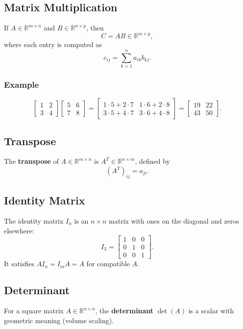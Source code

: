 \documentclass[a4paper,12pt]{article}
\begin{document}
\subsection{Matrix Multiplication}
If $A \in \mathbb{R}^{m \times n}$ and $B \in \mathbb{R}^{n \times p}$, then
\[
C = AB \in \mathbb{R}^{m \times p},
\]
where each entry is computed as
\[
c_{ij} = \sum_{k=1}^n a_{ik} b_{kj}.
\]

\subsubsection{Example}
\[
\begin{bmatrix}
1 & 2 \\
3 & 4
\end{bmatrix}
\begin{bmatrix}
5 & 6 \\
7 & 8
\end{bmatrix}
=
\begin{bmatrix}
1\cdot 5 + 2\cdot 7 & 1\cdot 6 + 2\cdot 8 \\
3\cdot 5 + 4\cdot 7 & 3\cdot 6 + 4\cdot 8
\end{bmatrix}
=
\begin{bmatrix}
19 & 22 \\
43 & 50
\end{bmatrix}.
\]

\subsection{Transpose}
The \textbf{transpose} of $A \in \mathbb{R}^{m \times n}$ is $A^T \in \mathbb{R}^{n \times m}$, defined by
\[
(A^T)_{ij} = a_{ji}.
\]

\subsection{Identity Matrix}
The identity matrix $I_n$ is an $n \times n$ matrix with ones on the diagonal and zeros elsewhere:
\[
I_3 =
\begin{bmatrix}
1 & 0 & 0 \\
0 & 1 & 0 \\
0 & 0 & 1
\end{bmatrix}.
\]
It satisfies $AI_n = I_m A = A$ for compatible $A$.

\subsection{Determinant}
For a square matrix $A \in \mathbb{R}^{n \times n}$, the \textbf{determinant} $\det(A)$ is a scalar with geometric meaning (volume scaling).  
\end{document}
